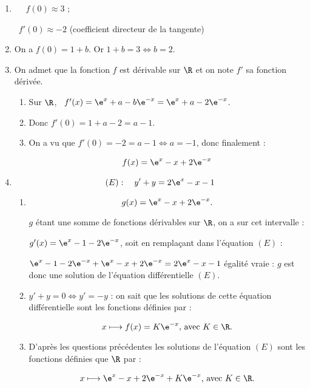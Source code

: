 \begin{enumerate}
\item ~%
\starredbullet~$f(0) \approx 3$ ;

\starredbullet~$f'(0) \approx - 2$ (coefficient directeur de la tangente)
\item %
On a $f(0) = 1 + b$. Or $1 + b = 3 \iff b = 2$.
\item On admet que la fonction $f$ est dérivable sur $\R$ et on note $f'$ sa fonction dérivée. 
	\begin{enumerate}
		\item %
Sur $\R$, \, $f'(x) = \e^x + a - b\e^{-x} = \e^x + a - 2\e^{-x}$.
		\item %
Donc $f'(0) = 1 + a - 2 = a - 1$.
		\item %
		On a vu que $f'(0) = - 2 = a - 1 \iff a = - 1$, donc finalement :
		
		\[f(x) = \e^x - x + 2\e^{-x}\]
	\end{enumerate}
\item %

\[(E) : \quad  y' + y = 2\e^x - x - 1\]

	\begin{enumerate}
		\item %
		
\[g(x) = \e^x - x + 2\e^{-x}.\]

$g$ étant une somme de fonctions dérivables sur $\R$, on a sur cet intervalle :

$g'(x) = \e^x - 1 - 2\e^{-x}$, soit en remplaçant dans l'équation $(E)$ :

$\e^x - 1 - 2\e^{-x} + \e^x - x + 2\e^{-x} = 2\e^x - x - 1$ égalité vraie : $g$ est donc une solution de l'équation différentielle $(E)$.

		\item %
$y' + y = 0 \iff y' = - y$ : on sait que les solutions de cette équation différentielle sont les fonctions définies par :

\[ x \longmapsto f(x) = K \e^{- x},\, \text{avec } K \in \R.\]

		\item %
D'après les questions précédentes les solutions de l'équation $(E)$ sont les fonctions définies que $\R$ par :

\[ x \longmapsto \e^x - x + 2\e^{-x} + K \e^{- x},\, \text{avec } K \in \R.\]
	\end{enumerate}
\end{enumerate}

